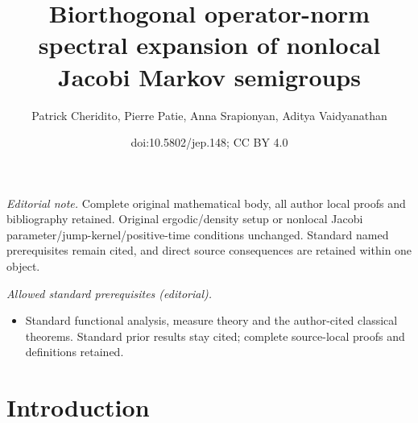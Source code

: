 \documentclass[10pt]{amsart}
\title{Biorthogonal operator-norm spectral expansion of nonlocal Jacobi Markov semigroups}
\author{Patrick Cheridito, Pierre Patie, Anna Srapionyan, Aditya Vaidyanathan}
\date{doi:10.5802/jep.148; CC BY 4.0}
\theoremstyle{plain}
\theoremstyle{definition}
\begin{document}
\maketitle
\noindent\textit{Editorial note.} Complete original mathematical body, all author local proofs and bibliography retained. Original ergodic/density setup or nonlocal Jacobi parameter/jump-kernel/positive-time conditions unchanged. Standard named prerequisites remain cited, and direct source consequences are retained within one object.\par\medskip
\noindent\textit{Allowed standard prerequisites (editorial).}\begin{itemize}
\item Standard functional analysis, measure theory and the author-cited classical theorems. Standard prior results stay cited; complete source-local proofs and definitions retained.
\end{itemize}\medskip
\enlargethispage{-1.5\baselineskip}%
\tableofcontents

\section{Introduction}
\end{document}
